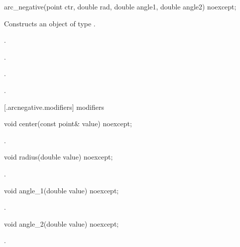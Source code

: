 \begin{itemdecl}
    arc_negative(point ctr, double rad, double angle1, double angle2) noexcept;
\end{itemdecl}
\begin{itemdescr}
	\pnum
	\effects
	Constructs an object of type .
	
	\pnum
	\postconditions
	.

	.

	.

	.

\end{itemdescr}

 [\iotwod.arcnegative.modifiers]{ modifiers}

\begin{itemdecl}
    void center(const point& value) noexcept;
\end{itemdecl}
\begin{itemdescr}
	\pnum
	\postconditions
	.
	
\end{itemdescr}

\begin{itemdecl}
    void radius(double value) noexcept;
\end{itemdecl}
\begin{itemdescr}
	\pnum
	\postconditions
	.
	
\end{itemdescr}

\begin{itemdecl}
    void angle_1(double value) noexcept;
\end{itemdecl}
\begin{itemdescr}
	\pnum
	\postconditions
	.
	
\end{itemdescr}

\begin{itemdecl}
    void angle_2(double value) noexcept;
\end{itemdecl}
\begin{itemdescr}
	\pnum
	\postconditions
	.
	
\end{itemdescr}

